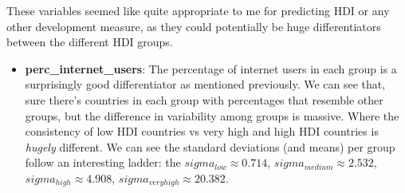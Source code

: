 \documentclass[]{article}
\providecommand{\tightlist}{%
  \setlength{\itemsep}{0pt}\setlength{\parskip}{0pt}}
\begin{document}
These variables seemed like quite appropriate to me for predicting HDI
or any other development measure, as they could potentially be huge
differentiators between the different HDI groups.

\begin{itemize}
\tightlist
\item
  \textbf{perc\_internet\_users}: The percentage of internet users in
  each group is a surprisingly good differentiator as mentioned
  previously. We can see that, sure there's countries in each group with
  percentages that resemble other groups, but the difference in
  variability among groups is massive. Where the consistency of low HDI
  countries vs very high and high HDI countries is \emph{hugely}
  different. We can see the standard deviations (and means) per group
  follow an interesting ladder: the \(sigma_{low} \approx 0.714\),
  \(sigma_{medium} \approx 2.532\), \(sigma_{high} \approx 4.908\),
  \(sigma_{very high} \approx 20.382\).
\end{itemize}
\end{document}
